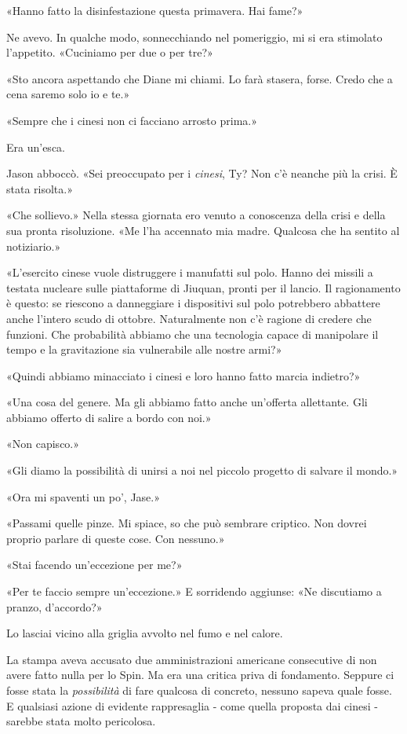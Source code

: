 «Hanno fatto la disinfestazione questa primavera. Hai fame?»

Ne avevo. In qualche modo, sonnecchiando nel pomeriggio, mi si era
stimolato l'appetito. «Cuciniamo per due o per tre?»

«Sto ancora aspettando che Diane mi chiami. Lo farà stasera, forse.
Credo che a cena saremo solo io e te.»

«Sempre che i cinesi non ci facciano arrosto prima.»

Era un'esca.

Jason abboccò. «Sei preoccupato per i \emph{cinesi}, Ty? Non c'è neanche
più la crisi. È stata risolta.»

«Che sollievo.» Nella stessa giornata ero venuto a conoscenza della
crisi e della sua pronta risoluzione. «Me l'ha accennato mia madre.
Qualcosa che ha sentito al notiziario.»

«L'esercito cinese vuole distruggere i manufatti sul polo. Hanno dei
missili a testata nucleare sulle piattaforme di Jiuquan, pronti per il
lancio. Il ragionamento è questo: se riescono a danneggiare i
dispositivi sul polo potrebbero abbattere anche l'intero scudo di
ottobre. Naturalmente non c'è ragione di credere che funzioni. Che
probabilità abbiamo che una tecnologia capace di manipolare il tempo e
la gravitazione sia vulnerabile alle nostre armi?»

«Quindi abbiamo minacciato i cinesi e loro hanno fatto marcia indietro?»

«Una cosa del genere. Ma gli abbiamo fatto anche un'offerta allettante.
Gli abbiamo offerto di salire a bordo con noi.»

«Non capisco.»

«Gli diamo la possibilità di unirsi a noi nel piccolo progetto di
salvare il mondo.»

«Ora mi spaventi un po', Jase.»

«Passami quelle pinze. Mi spiace, so che può sembrare criptico. Non
dovrei proprio parlare di queste cose. Con nessuno.»

«Stai facendo un'eccezione per me?»

«Per te faccio sempre un'eccezione.» E sorridendo aggiunse: «Ne
discutiamo a pranzo, d'accordo?»

Lo lasciai vicino alla griglia avvolto nel fumo e nel calore.

\separatorefiori

La stampa aveva accusato due amministrazioni americane consecutive di
non avere fatto nulla per lo Spin. Ma era una critica priva di
fondamento. Seppure ci fosse stata la \emph{possibilità} di fare
qualcosa di concreto, nessuno sapeva quale fosse. E qualsiasi azione di
evidente rappresaglia - come quella proposta dai cinesi - sarebbe stata
molto pericolosa.

